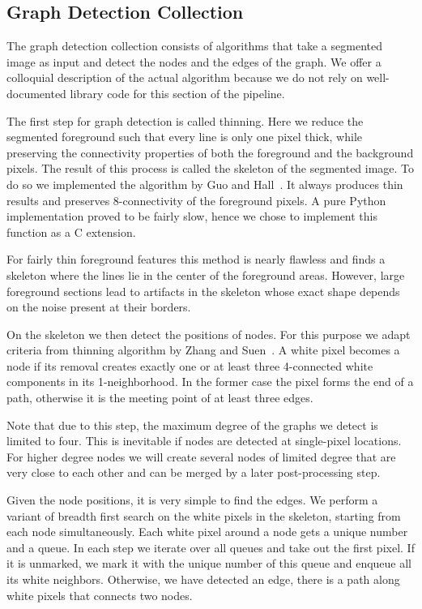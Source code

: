 	\subsection{Graph Detection Collection} 

		The graph detection collection consists of algorithms that take a segmented image as input and detect the nodes and the edges of the graph. We offer a colloquial description of the actual algorithm because we do not rely on well-documented library code for this section of the pipeline. 

		The first step for graph detection is called thinning. Here we reduce the segmented foreground such that every line is only one pixel thick, while preserving the connectivity properties of both the foreground and the background pixels. The result of this process is called the skeleton of the segmented image. To do so we implemented the algorithm by Guo and Hall~\cite{guo1989parallel}. It always produces thin results and preserves 8-connectivity of the foreground pixels. A pure Python implementation proved to be fairly slow, hence we chose to implement this function as a C extension.

		For fairly thin foreground features this method is nearly flawless and finds a skeleton where the lines lie in the center of the foreground areas. However, large foreground sections lead to artifacts in the skeleton whose exact shape depends on the noise present at their borders.

		On the skeleton we then detect the positions of nodes. For this purpose we adapt criteria from thinning algorithm by Zhang and Suen~\cite{zhang1984fast}. A white pixel becomes a node if its removal creates exactly one or at least three 4-connected white components in its 1-neighborhood. In the former case the pixel forms the end of a path, otherwise it is the meeting point of at least three edges.

		Note that due to this step, the maximum degree of the graphs we detect is limited to four. This is inevitable if nodes are detected at single-pixel locations. For higher degree nodes we will create several nodes of limited degree that are very close to each other and can be merged by a later post-processing step.

		Given the node positions, it is very simple to find the edges. We perform a variant of breadth first search on the white pixels in the skeleton, starting from each node simultaneously. Each white pixel around a node gets a unique number and a queue. In each step we iterate over all queues and take out the first pixel. If it is unmarked, we mark it with the unique number of this queue and enqueue all its white neighbors. Otherwise, we have detected an edge, \ie there is a path along white pixels that connects two nodes.

